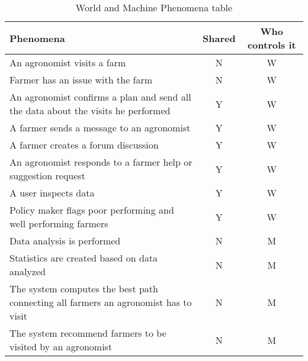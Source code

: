 
\begin{table}[H]
\centering
\begin{tabular}{|p{}| c| c|}
\hline
\textbf{Phenomena}        & \textbf{Shared} & \textbf{Who controls it} \\ \hline

An agronomist visits a farm & N & W \\ \hline
Farmer has an issue with the farm & N & W \\ \hline
An agronomist confirms a plan and send all the data about the visits he performed  & Y & W \\ \hline
A farmer sends a message to an agronomist & Y &  W\\ \hline
A farmer creates a forum discussion & Y & W  \\ \hline
An agronomist responds to a farmer help or suggestion request & Y & W \\ \hline 
A user inspects data & Y & W \\ \hline
Policy maker flags poor performing and well performing farmers & Y & W \\ \hline

Data analysis is performed & N & M  \\ \hline
Statistics are created based on data analyzed  & N & M  \\ \hline
The system computes the best path connecting all farmers an agronomist has to visit  & N & M  \\ \hline
The system recommend farmers to be visited by an agronomist & N & M  \\ \hline
\end{tabular}

\caption{World and Machine Phenomena table}
\label{PhenomenaTable}
\end{table}
